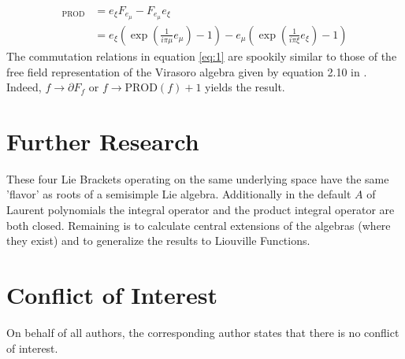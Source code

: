 \documentclass{artjlt}
\newcommand{\?}{\textbackslash}
\begin{document}
      \begin{align}
          [e_\xi, e_\mu]_\text{PROD} &= e_\xi F_{e_{\mu}} - F_{e_{\mu}} e_{\xi} \nonumber \\
          &= e_\xi (\exp(\frac{1}{i \pi \mu} e_\mu) - 1) - e_\mu(\exp(\frac{1}{i \pi \xi} e_\xi) -1) \label{eq:1}
      \end{align}
      The commutation relations in equation \ref{eq:1} are spookily similar to those of the free field representation of the Virasoro algebra given by equation 2.10 in \cite{teschner2017guidetwodimensionalconformalfield}.
      Indeed, $f \to \partial F_f$ or $f \to \text{PROD}(f) + 1$ yields the result. 
      \section{Further Research}
   These four Lie Brackets operating on the same underlying space have the same 'flavor' as roots of a semisimple Lie algebra. 
   Additionally in the default $A$ of Laurent polynomials the integral operator and the product integral operator are both closed. 
   Remaining is to calculate central extensions of the algebras (where they exist) and to generalize the results to Liouville Functions.
\section*{Conflict of Interest}
On behalf of all authors, the corresponding author states that there is no conflict of interest.
\end{document}
